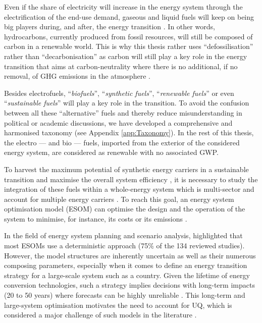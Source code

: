 Even if the share of electricity will increase in the energy system through the electrification of the end-use demand, gaseous and liquid fuels will keep on being big players during, and after, the energy transition \cite{Ahlgren2012}. In other words, hydrocarbons, currently produced from fossil resources, will still be composed of carbon in a renewable world. This is why this thesis rather uses ``defossilisation'' rather than ``decarbonisation'' as carbon will still play a key role in the energy transition that aims at carbon-neutrality where there is no additional, if no removal, of \gls{GHG} emissions in the atmosphere \cite{mertens2020carbon}. 

Besides electrofuels, ``\emph{biofuels}'', ``\emph{synthetic fuels}'', ``\emph{renewable fuels}'' or even ``\emph{sustainable fuels}'' will play a key role in the transition. To avoid the confusion between all these ``alternative'' fuels and thereby reduce misunderstanding in political or academic discussions, we have developed a comprehensive and harmonised taxonomy (see Appendix \ref{app:Taxonomy}).  In the rest of this thesis, the electro --- and bio --- fuels, imported from the exterior of the considered energy system, are considered as renewable with no associated \gls{GWP}. 

To harvest the maximum potential of synthetic energy carriers in a sustainable transition and maximise the overall system efficiency \cite{mathiesen2015}, it is necessary to study the integration of these fuels within a whole-energy system which is multi-sector and account for multiple energy carriers \cite{contino2020whole}. To reach this goal, an energy system optimisation model (ESOM) can optimise the design and the operation of the system to minimise, for instance, its costs or its emissions \cite{zeng2011review}. 

In the field of energy system planning and scenario analysis, \citet{yue2018review} highlighted that most ESOMs use a deterministic approach (75\% of the 134 reviewed studies). However, the model structures are inherently uncertain as well as their numerous composing parameters, especially when it comes to define an energy transition strategy for a large-scale system such as a country. Given the lifetime of energy conversion technologies, such a strategy implies decisions with long-term impacts (20 to 50 years) where forecasts can be highly unreliable \cite{Moret2017}. This long-term and large-system optimisation motivates the need to account for \gls{UQ}, which is considered a major challenge of such models in the literature \cite{pfenninger2014energy}. %

